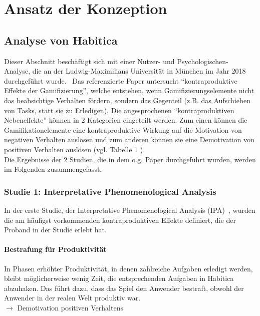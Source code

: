 \documentclass[sigconf, nonacm]{acmart}
\begin{document}
\section{Ansatz der Konzeption}\label{sec:conception}

\subsection{Analyse von Habitica}\label{sec:analysis}
Dieser Abschnitt beschäftigt sich mit einer Nutzer- und Psychologischen- Analyse, die an der Ludwig-Maximilians Universität in München im Jahr 2018 durchgeführt wurde.~\cite{diefenbach_counterproductive_2019} Das referenzierte Paper untersucht \enquote{kontraproduktive Effekte der Gamifizierung}, welche entstehen, wenn Gamifizierungselemente nicht das beabsichtige Verhalten fördern, sondern das Gegenteil (z.B. das Aufschieben von Tasks, statt sie zu Erledigen). 
Die angesprochenen \enquote{kontraproduktiven Nebeneffekte} können in 2 Kategorien eingeteilt werden. Zum einen können die Gamifikationelemente eine kontraproduktive Wirkung auf die Motivation von negativen Verhalten auslösen und zum anderen können sie eine Demotivation von positiven Verhalten auslösen (vgl. Tabelle 1 \cite{diefenbach_counterproductive_2019}).
\\
Die Ergebnisse der 2 Studien, die in dem o.g. Paper durchgeführt wurden, werden im Folgenden zusammengefasst.
\\

\subsubsection{Studie 1: Interpretative Phenomenological Analysis}
In der erste Studie, der  Interpretative Phenomenological Analysis (IPA)~\cite{smith_reflecting_2004}, wurden die am häufigst vorkommenden kontraproduktiven Effekte definiert, die der Proband in der Studie erlebt hat.

\paragraph{Bestrafung für Produktivität}\label{sec:cpe1}
In Phasen erhöhter Produktivität, in denen zahlreiche Aufgaben erledigt werden, bleibt möglicherweise wenig Zeit, die entsprechenden Aufgaben in Habitica abzuhaken. Das führt dazu, dass das Spiel den Anwender bestraft, obwohl der Anwender in der realen Welt produktiv war.\\
$\rightarrow$ Demotivation positiven Verhaltens
\end{document}
